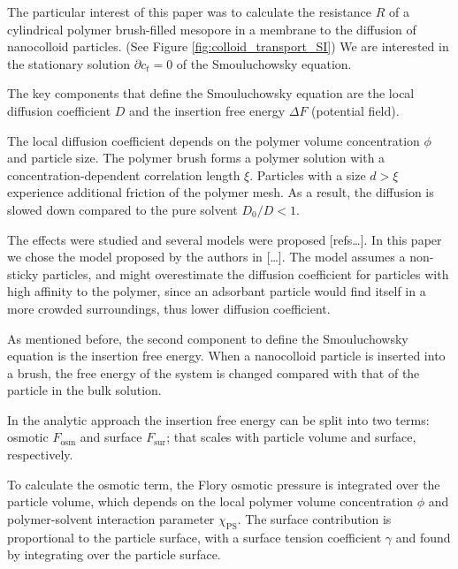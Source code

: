 \documentclass[10pt, a4paper]{article}
\begin{document}
\begin{multicols}{2}
The particular interest of this paper was to calculate the resistance $R$ of a cylindrical polymer brush-filled mesopore in a membrane to the diffusion of nanocolloid particles. (See Figure \ref{fig:colloid_transport_SI})
We are interested in the stationary solution $\partial c_t = 0$ of the Smouluchowsky equation. 

The key components that define the Smouluchowsky equation are the local diffusion coefficient $D$ and the insertion free energy $\Delta F$ (potential field). 

The local diffusion coefficient depends on the polymer volume concentration $\phi$ and particle size. 
The polymer brush forms a polymer solution with a concentration-dependent correlation length $\xi$. 
Particles with a size $d>\xi$ experience additional friction of the polymer mesh. 
As a result, the diffusion is slowed down compared to the pure solvent $D_0/D<1$.

The effects were studied and several models were proposed [refs\dots]. 
In this paper we chose the model proposed by the authors in [\dots].
The model assumes a non-sticky particles, and might overestimate the diffusion coefficient for particles with high affinity to the polymer, since an adsorbant particle would find itself in a more crowded surroundings, thus lower diffusion coefficient.

As mentioned before, the second component to define the Smouluchowsky equation is the insertion free energy. 
When a nanocolloid particle is inserted into a brush, the free energy of the system is changed compared with that of the particle in the bulk solution. 

In the analytic approach the insertion free energy can be split into two terms: osmotic $F_{\textrm{osm}}$ and surface $F_{\textrm{sur}}$; that scales with particle volume and surface, respectively.

To calculate the osmotic term, the Flory osmotic pressure is integrated over the particle volume, which depends on the local polymer volume concentration $\phi$ and polymer-solvent interaction parameter $\chi_{\textrm{PS}}$.
The surface contribution is proportional to the particle surface, with a surface tension coefficient $\gamma$ and found by integrating over the particle surface.


\end{multicols}
\end{document}
